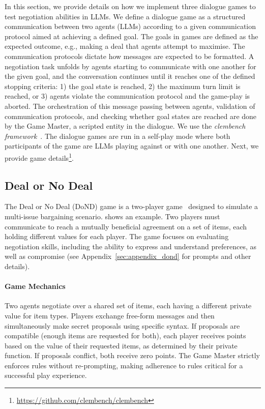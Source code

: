 \documentclass[11pt]{article}
\providecommand{\DIFaddbegin}{} %
\providecommand{\DIFaddend}{} %
\newcommand{\DIFaddincludegraphics}[2][]{{\color{blue}\fbox{\DIFOincludegraphics[#1]{#2}}}} %
\DeclareRobustCommand{\DIFaddbegin}{\DIFOaddbegin \let\includegraphics\DIFaddincludegraphics} %
\DeclareRobustCommand{\DIFaddend}{\DIFOaddend \let\includegraphics\DIFOincludegraphics} %
\begin{document}
In this section, we provide details on how we implement three dialogue games to test negotiation abilities in LLMs. We define a dialogue game as a structured communication between two agents (LLMs) according to a given communication protocol aimed at achieving a defined goal. The goals in games are defined as the expected outcome, e.g., making a deal that agents attempt to maximise. The communication protocols dictate how messages are expected to be formatted. A negotiation task unfolds by agents starting to communicate with one another for the given goal, and the conversation continues until it reaches one of the defined stopping criteria: 1) the goal state is reached, 2) the maximum turn limit is reached, or 3) agents violate the communication protocol and the game-play is aborted. The orchestration of this message passing between agents, validation of communication protocols, and checking whether goal states are reached are done by the Game Master, a scripted entity in the dialogue. We use the \textit{clembench framework}~\cite{chalamalasetti-etal-2023-clembench}. The dialogue games are run in a self-play mode where both participants of the game are LLMs playing against or with one another. Next, we provide game details\DIFaddbegin \footnote{\url{https://github.com/clembench/clembench}}\DIFaddend .

\subsection{Deal or No Deal}



The Deal or No Deal (DoND) game is a two-player game~\cite{lewis-etal-2017-deal} designed to simulate a multi-issue bargaining scenario.  shows an example. Two players must communicate to reach a mutually beneficial agreement on a set of items, each holding different values for each player. The game focuses on evaluating negotiation skills, including the ability to express and understand preferences, as well as compromise (see Appendix~\ref{sec:appendix_dond} for prompts and other details).



\paragraph{Game Mechanics}
Two agents negotiate over a shared set of items, each having a different private value for item types. Players exchange free-form messages and then simultaneously make secret proposals using specific syntax. If proposals are compatible (enough items are requested for both), each player receives points based on the value of their requested items, as determined by their private function. If proposals conflict, both receive zero points. The Game Master strictly enforces rules without re-prompting, making adherence to rules critical for a successful play experience.
\end{document}
